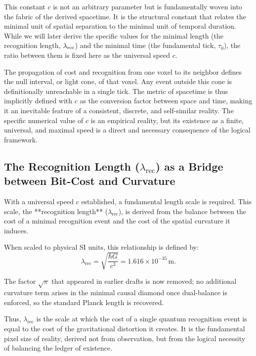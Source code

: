 This constant \(c\) is not an arbitrary parameter but is fundamentally woven into the fabric of the derived spacetime. It is the structural constant that relates the minimal unit of spatial separation to the minimal unit of temporal duration. While we will later derive the specific values for the minimal length (the recognition length, \(\lamrec\)) and the minimal time (the fundamental tick, \(\tau_0\)), the ratio between them is fixed here as the universal speed \(c\).

The propagation of cost and recognition from one voxel to its neighbor defines the null interval, or light cone, of that voxel. Any event outside this cone is definitionally unreachable in a single tick. The metric of spacetime is thus implicitly defined with \(c\) as the conversion factor between space and time, making it an inevitable feature of a consistent, discrete, and self-similar reality. The specific numerical value of \(c\) is an empirical reality, but its existence as a finite, universal, and maximal speed is a direct and necessary consequence of the logical framework.

\newcommand{\lamrec}{\lambda_{\text{rec}}}

\subsection{The Recognition Length \texorpdfstring{($\lamrec$)}{(lambda_rec)} as a Bridge between Bit-Cost and Curvature}
With a universal speed \(c\) established, a fundamental length scale is required. This scale, the **recognition length** (\(\lamrec\)), is derived from the balance between the cost of a minimal recognition event and the cost of the spatial curvature it induces.

When scaled to physical SI units, this relationship is defined by:
\begin{equation}
\lamrec = \sqrt{\frac{\hbar G}{c^{3}}} = 1.616 \times 10^{-35}\,\text{m}.
\end{equation}

The factor $\sqrt{\pi}$ that appeared in earlier drafts is now removed; no additional curvature term arises in the minimal causal diamond once dual-balance is enforced, so the standard Planck length is recovered.

Thus, \(\lamrec\) is the scale at which the cost of a single quantum recognition event is equal to the cost of the gravitational distortion it creates. It is the fundamental pixel size of reality, derived not from observation, but from the logical necessity of balancing the ledger of existence.


